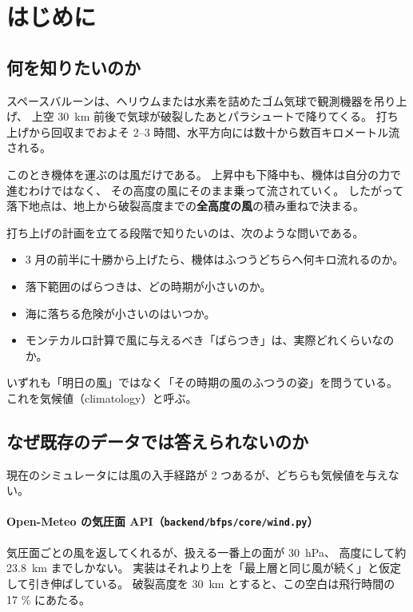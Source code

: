 \section{はじめに}

\subsection{何を知りたいのか}

スペースバルーンは、ヘリウムまたは水素を詰めたゴム気球で観測機器を吊り上げ、
上空 \SI{30}{\kilo\metre} 前後で気球が破裂したあとパラシュートで降りてくる。
打ち上げから回収までおよそ 2--3 時間、水平方向には数十から数百キロメートル流される。

このとき機体を運ぶのは風だけである。
上昇中も下降中も、機体は自分の力で進むわけではなく、
その高度の風にそのまま乗って流されていく。
したがって落下地点は、地上から破裂高度までの\textbf{全高度の風}の積み重ねで決まる。

打ち上げの計画を立てる段階で知りたいのは、次のような問いである。

\begin{itemize}
  \item 3 月の前半に十勝から上げたら、機体はふつうどちらへ何キロ流れるのか。
  \item 落下範囲のばらつきは、どの時期が小さいのか。
  \item 海に落ちる危険が小さいのはいつか。
  \item モンテカルロ計算で風に与えるべき「ばらつき」は、実際どれくらいなのか。
\end{itemize}

いずれも「明日の風」ではなく「その時期の風のふつうの姿」を問うている。
これを気候値（climatology）と呼ぶ。

\subsection{なぜ既存のデータでは答えられないのか}
\label{sec:intro-ceiling}

現在のシミュレータには風の入手経路が 2 つあるが、どちらも気候値を与えない。

\paragraph{Open-Meteo の気圧面 API（\texttt{backend/bfps/core/wind.py}）}
気圧面ごとの風を返してくれるが、扱える一番上の面が \SI{30}{\hecto\pascal}、
高度にして約 \SI{23.8}{\kilo\metre} までしかない。
実装はそれより上を「最上層と同じ風が続く」と仮定して引き伸ばしている。
破裂高度を \SI{30}{\kilo\metre} とすると、この空白は飛行時間の 17 \% にあたる。

